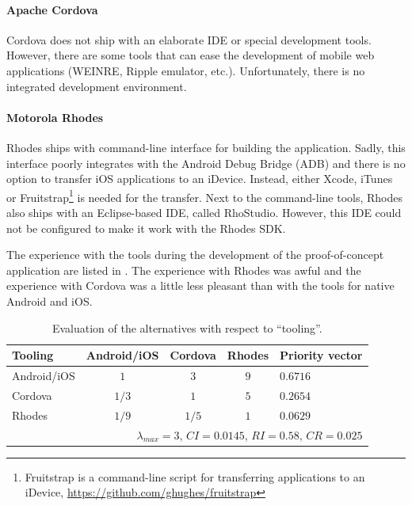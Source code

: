 \paragraph{Apache Cordova} Cordova does not ship with an elaborate IDE or special development tools. However, there are some tools that can ease the development of mobile web applications (WEINRE, Ripple emulator, etc.). Unfortunately, there is no integrated development environment. 

\paragraph{Motorola Rhodes} Rhodes ships with command-line interface for building the application. Sadly, this interface poorly integrates with the  Android Debug Bridge (ADB) and there is no option to transfer iOS applications to an iDevice. Instead, either Xcode, iTunes or Fruitstrap\footnote{Fruitstrap is a command-line script for transferring applications to an iDevice, \url{https://github.com/ghughes/fruitstrap}} is needed for the transfer. Next to the command-line tools, Rhodes also ships with an Eclipse-based IDE, called RhoStudio. However, this IDE could not be configured to make it work with the Rhodes SDK. 

The experience with the tools during the development of the proof-of-concept application are listed in . The experience with Rhodes was awful and the experience with Cordova was a little less pleasant than with the tools for native Android and iOS. 

\begin{table}[h!]
    \centering
    \begin{tabular}{lcccl}
        \hline
        \textbf{Tooling} & Android/iOS & Cordova & Rhodes & Priority vector \\
        \hline
        Android/iOS      & $1$         & $3$     & $9$    & $0.6716$        \\
        Cordova          & $1/3$       & $1$     & $5$    & $0.2654$        \\
        Rhodes           & $1/9$       & $1/5$   & $1$    & $0.0629$        \\
        \hline
        \multicolumn{5}{r}{$\lambda_{max} = 3$, $CI = 0.0145$, $RI = 0.58$, $CR = 0.025$}\\
        \hline
    \end{tabular}
    \caption{Evaluation of the alternatives with respect to ``tooling''.}
    \label{tab:tooling}
\end{table}

